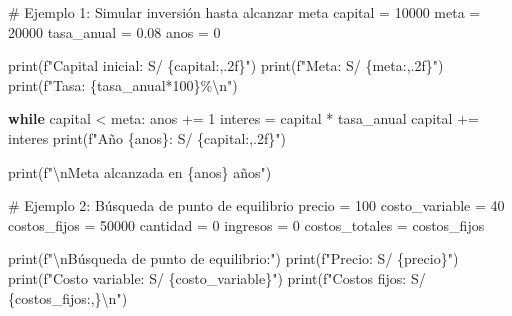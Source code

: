 \documentclass[
  doc,
  floatsintext,
  longtable,
  a4paper,
  nolmodern,
  notxfonts,
  notimes,
  12pt,
  colorlinks=true,linkcolor=blue,citecolor=blue,urlcolor=blue]{apa7}
\newenvironment{Shaded}{\begin{snugshade}}{\end{snugshade}}
\newcommand{\BuiltInTok}[1]{\textcolor[rgb]{0.00,0.23,0.31}{#1}}
\newcommand{\CharTok}[1]{\textcolor[rgb]{0.13,0.47,0.30}{#1}}
\newcommand{\CommentTok}[1]{\textcolor[rgb]{0.37,0.37,0.37}{#1}}
\newcommand{\ControlFlowTok}[1]{\textcolor[rgb]{0.00,0.23,0.31}{\textbf{#1}}}
\newcommand{\DecValTok}[1]{\textcolor[rgb]{0.68,0.00,0.00}{#1}}
\newcommand{\FloatTok}[1]{\textcolor[rgb]{0.68,0.00,0.00}{#1}}
\newcommand{\NormalTok}[1]{\textcolor[rgb]{0.00,0.23,0.31}{#1}}
\newcommand{\OperatorTok}[1]{\textcolor[rgb]{0.37,0.37,0.37}{#1}}
\newcommand{\SpecialCharTok}[1]{\textcolor[rgb]{0.37,0.37,0.37}{#1}}
\newcommand{\SpecialStringTok}[1]{\textcolor[rgb]{0.13,0.47,0.30}{#1}}
\begin{document}
\begin{Shaded}
\begin{Highlighting}[]
\CommentTok{\# Ejemplo 1: Simular inversión hasta alcanzar meta}
\NormalTok{capital }\OperatorTok{=} \DecValTok{10000}
\NormalTok{meta }\OperatorTok{=} \DecValTok{20000}
\NormalTok{tasa\_anual }\OperatorTok{=} \FloatTok{0.08}
\NormalTok{anos }\OperatorTok{=} \DecValTok{0}

\BuiltInTok{print}\NormalTok{(}\SpecialStringTok{f"Capital inicial: S/ }\SpecialCharTok{\{}\NormalTok{capital}\SpecialCharTok{:,.2f\}}\SpecialStringTok{"}\NormalTok{)}
\BuiltInTok{print}\NormalTok{(}\SpecialStringTok{f"Meta: S/ }\SpecialCharTok{\{}\NormalTok{meta}\SpecialCharTok{:,.2f\}}\SpecialStringTok{"}\NormalTok{)}
\BuiltInTok{print}\NormalTok{(}\SpecialStringTok{f"Tasa: }\SpecialCharTok{\{}\NormalTok{tasa\_anual}\OperatorTok{*}\DecValTok{100}\SpecialCharTok{\}}\SpecialStringTok{\%}\CharTok{\textbackslash{}n}\SpecialStringTok{"}\NormalTok{)}

\ControlFlowTok{while}\NormalTok{ capital }\OperatorTok{\textless{}}\NormalTok{ meta:}
\NormalTok{    anos }\OperatorTok{+=} \DecValTok{1}
\NormalTok{    interes }\OperatorTok{=}\NormalTok{ capital }\OperatorTok{*}\NormalTok{ tasa\_anual}
\NormalTok{    capital }\OperatorTok{+=}\NormalTok{ interes}
    \BuiltInTok{print}\NormalTok{(}\SpecialStringTok{f"Año }\SpecialCharTok{\{}\NormalTok{anos}\SpecialCharTok{\}}\SpecialStringTok{: S/ }\SpecialCharTok{\{}\NormalTok{capital}\SpecialCharTok{:,.2f\}}\SpecialStringTok{"}\NormalTok{)}

\BuiltInTok{print}\NormalTok{(}\SpecialStringTok{f"}\CharTok{\textbackslash{}n}\SpecialStringTok{Meta alcanzada en }\SpecialCharTok{\{}\NormalTok{anos}\SpecialCharTok{\}}\SpecialStringTok{ años"}\NormalTok{)}

\CommentTok{\# Ejemplo 2: Búsqueda de punto de equilibrio}
\NormalTok{precio }\OperatorTok{=} \DecValTok{100}
\NormalTok{costo\_variable }\OperatorTok{=} \DecValTok{40}
\NormalTok{costos\_fijos }\OperatorTok{=} \DecValTok{50000}
\NormalTok{cantidad }\OperatorTok{=} \DecValTok{0}
\NormalTok{ingresos }\OperatorTok{=} \DecValTok{0}
\NormalTok{costos\_totales }\OperatorTok{=}\NormalTok{ costos\_fijos}

\BuiltInTok{print}\NormalTok{(}\SpecialStringTok{f"}\CharTok{\textbackslash{}n}\SpecialStringTok{Búsqueda de punto de equilibrio:"}\NormalTok{)}
\BuiltInTok{print}\NormalTok{(}\SpecialStringTok{f"Precio: S/ }\SpecialCharTok{\{}\NormalTok{precio}\SpecialCharTok{\}}\SpecialStringTok{"}\NormalTok{)}
\BuiltInTok{print}\NormalTok{(}\SpecialStringTok{f"Costo variable: S/ }\SpecialCharTok{\{}\NormalTok{costo\_variable}\SpecialCharTok{\}}\SpecialStringTok{"}\NormalTok{)}
\BuiltInTok{print}\NormalTok{(}\SpecialStringTok{f"Costos fijos: S/ }\SpecialCharTok{\{}\NormalTok{costos\_fijos}\SpecialCharTok{:,\}}\CharTok{\textbackslash{}n}\SpecialStringTok{"}\NormalTok{)}


\end{Highlighting}
\end{Shaded}
\end{document}
